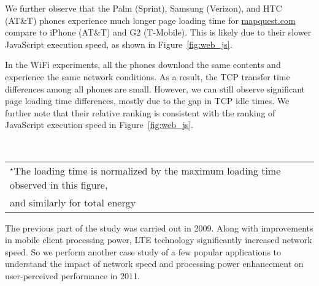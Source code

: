 We further observe that the Palm (Sprint), Samsung (Verizon), and 
HTC (AT\&T) phones experience much longer page loading time for
\url{mapquest.com} compare to iPhone (AT\&T) and G2 (T-Mobile). 
This is likely due to their slower JavaScript execution speed,
as shown in Figure~\ref{fig:web_js}. 


In the WiFi experiments, all the phones download the same contents and 
experience the same network conditions. As a result, the TCP transfer
time differences among all phones are small. However, we can still 
observe significant page loading time differences, mostly due to the
gap in TCP idle times. We further note that their relative ranking is 
consistent with the ranking of JavaScript execution speed in 
Figure~\ref{fig:web_js}.


\begin{figure*}[t]
\centering
{}
\\
\small
\begin{tabular}{l}
$^\star$The loading time is normalized by the maximum loading time observed in this figure,\\
and similarly for total energy
\end{tabular}
\label{fig:app.compare}
\end{figure*}

The previous part of the study was carried out in 2009. Along with improvements in mobile client processing power, LTE technology significantly increased network speed. So we perform another case study of a few popular applications to understand the impact of network speed and processing power enhancement on user-perceived performance in 2011.

